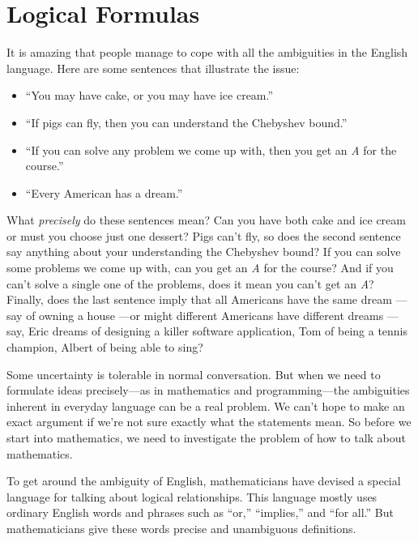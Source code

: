 \chapter{Logical Formulas}\label{logicform_chap}

It is amazing that people manage to cope with all the ambiguities in the
English language.  Here are some sentences that illustrate the issue:
%
\begin{itemize}
\item ``You may have cake, or you may have ice cream.''
\item ``If pigs can fly, then you can understand the Chebyshev bound.''
\item ``If you can solve any problem we come up with, then you get an
  \emph{A} for the course.''
\item ``Every American has a dream.''
\end{itemize}
%
What \emph{precisely} do these sentences mean?  Can you have both
cake and ice cream or must you choose just one dessert?  Pigs can't
fly, so does the second sentence say anything about your understanding
the Chebyshev bound? If you can solve some problems we come up with,
can you get an \emph{A} for the course?  And if you can't solve a
single one of the problems, does it mean you can't get an \emph{A}?
Finally, does the last sentence imply that all Americans have the same
dream ---say of owning a house ---or might different Americans have
different dreams ---say, Eric dreams of designing a killer software
application, Tom of being a tennis champion, Albert of being able to
sing?

Some uncertainty is tolerable in normal conversation.  But when we need to
formulate ideas precisely---as in mathematics and programming---the
ambiguities inherent in everyday language can be a real problem.  We can't
hope to make an exact argument if we're not sure exactly what the
statements mean.  So before we start into mathematics, we need to
investigate the problem of how to talk about mathematics.

To get around the ambiguity of English, mathematicians have devised a
special language for talking about logical relationships.  This language
mostly uses ordinary English words and phrases such as ``or,''
``implies,'' and ``for all.''  But mathematicians give these words precise
and unambiguous definitions.  \iffalse A pitfall to watch out for is
confusing ordinary language with mathematical language that sounds
ordinary but isn't.\fi

